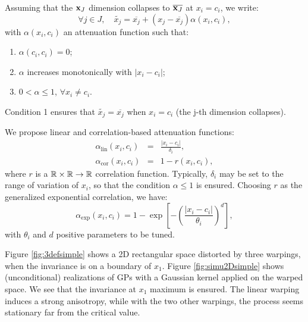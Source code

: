 	Assuming that the $\mathbf{x}_J$ dimension collapses to $\overline{\mathbf{x}_J}$ at $x_i=c_i$, we write:
	\begin{equation}
	\forall j \in J, \quad \widetilde{x_j} = \overline{x_j} + \left( x_j - \overline{x_j}\right)\alpha(x_i, c_i),
	\end{equation}
	with $\alpha(x_i, c_i)$ an attenuation function such that:
	\begin{enumerate}
		\item $\alpha(c_i, c_i) = 0$;
		\item $\alpha$ increases monotonically with $\lvert x_i - c_i\rvert$;
		\item $0 < \alpha \leq 1$, $\forall x_i \neq c_i$.
	\end{enumerate}
	Condition 1 ensures that $\widetilde{x_j} = \overline{x_j}$ when $x_i=c_i$ (the j-th dimension collapses).
	
	We propose linear and correlation-based attenuation functions: 
	\begin{eqnarray}
	\alpha_\text{lin}(x_i, c_i) &=& \frac{\lvert x_i - c_i \rvert}{\delta_i}, \\
	\alpha_\text{cor}(x_i, c_i) &=& 1 - r(x_i, c_i),
	\end{eqnarray}
	where $r$ is a $\mathbb{R} \times \mathbb{R}\rightarrow \mathbb{R}$ correlation function.
	Typically, $\delta_i$ may be set to the range of variation of $x_i$, so that the condition $\alpha \leq 1$ is ensured.
	Choosing $r$ as the generalized exponential correlation, we have:
	\begin{equation}
	\alpha_\text{exp}(x_i, c_i) = 1 - \exp \left[ - \left(\frac{\lvert x_i - c_i \rvert}{\theta_i}\right)^d \right],
	\end{equation}
	with $\theta_i$ and $d$ positive parameters to be tuned. 
	
	Figure \ref{fig:3defsimple} shows a 2D rectangular space distorted by three warpings, when the invariance is on a boundary of $x_1$.
	Figure \ref{fig:simu2Dsimple} shows (unconditional) realizations of GPs with a Gaussian kernel applied on the warped space. 
	We see that the invariance at $x_1$ maximum is ensured. The linear warping induces a strong anisotropy, while with the two other warpings,
	the process seems stationary far from the critical value.
	
